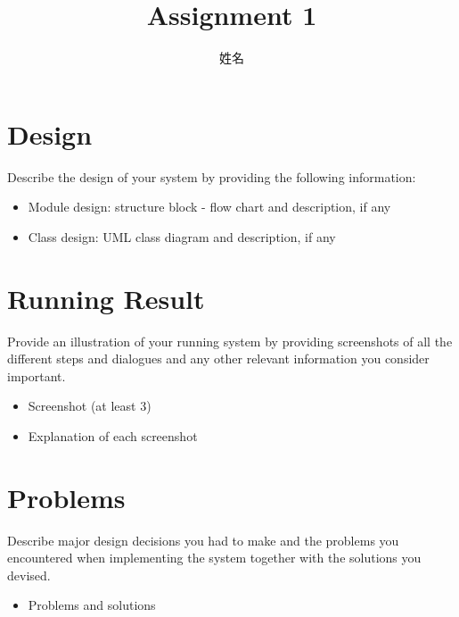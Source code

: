 \documentclass[onecolumn,oneside]{SUSTechHomework}
\author{姓名}
\title{Assignment 1}
\begin{document}
  \maketitle
    
  \section{Design}
      
      Describe the design of your system by providing the following information:
      \begin{itemize}
      	\item Module design: structure block - flow chart and description, if any
	\item Class design: UML class diagram and description, if any
      \end{itemize}
      
    \vspace{4em}
    
  \section{Running Result}
      Provide an illustration of your running system by providing screenshots of all the different steps and dialogues and any other relevant information you consider important.
      \begin{itemize}
        \item Screenshot (at least 3)
        \item Explanation of each screenshot
      \end{itemize}
    
    \vspace{4em}

  \section{Problems}
      Describe major design decisions you had to make and the problems you encountered when implementing the system together with the solutions you devised.
      \begin{itemize}
        \item Problems and solutions
      \end{itemize}
\end{document}

